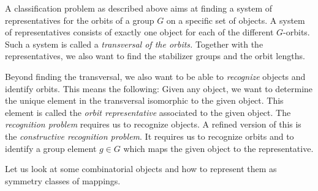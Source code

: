 \bigskip









A classification problem as described above 
aims at finding a system 
of representatives for the orbits of a group $G$
on a specific set of objects. 
A system of representatives consists of exactly one 
object for each of the different $G$-orbits.
Such a system is called a {\em transversal of the orbits.}
Together with the representatives, we also want to 
find the stabilizer groups and the orbit lengths. 

\bigskip

Beyond finding the transversal, 
we also want to be able to {\em recognize} objects and identify orbits.
This means the following:
Given any object, we want to determine the unique 
element in the transversal isomorphic to the given object.
This element is called the {\em orbit representative} 
associated to the given object.
The {\em recognition problem} requires 
us to recognize objects. 
A refined version of this is the 
{\em constructive recognition problem}. It requires 
us to recognize orbits 
and to identify a group element $g \in G$ which maps the 
given object to the representative.


\bigskip


Let us look at some combinatorial objects and how 
to represent them as symmetry classes of mappings.

